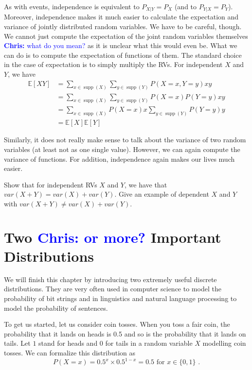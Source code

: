 \documentclass[a4paper,11pt,leqno]{report}
\newcommand{\chris}[1]{ \textcolor{blue}{\textbf{Chris:} #1}}
\newcommand{\supp}{\operatorname{supp}}
\newcommand{\E}{\mathbb{E}}
\begin{document}
As with events, independence is equivalent to $ P_{X|Y} = P_{X} $ (and
to $P_{Y|X}=P_Y$). Moreover, independence makes it much easier to calculate the expectation and variance of jointly distributed random variables. We have to be careful, though. We
cannot just compute the expectation of the joint random variables
themselves\chris{what do you mean?} as it is unclear what this would even be.
What we can do is to compute the expectation of functions of them. The standard choice in the case of expectation
is to simply multiply the RVs. For independent $X$ and $Y$, we have
\begin{align}
\E[XY] &= \sum_{x \in \supp(X)} \sum_{y \in \supp(Y)} P(X=x,Y=y) x y \\
&= \sum_{x \in \supp(X)} \sum_{y \in \supp(Y)} P(X=x)P(Y=y) x y \\
&= \sum_{x \in \supp(X)} P(X=x)x \sum_{y \in \supp(Y)}  P(Y=y) y \\
&= \E[X]\E[Y]
\end{align}

Similarly, it does not really make sense to talk about the variance of two random variables (at least not as one single
value). However, we can again compute the variance of functions. For addition, independence again makes our lives
much easier.

\begin{Exercise}
Show that for independent RVs $X$ and $Y$, we have that $ var(X + Y) =
var(X) + var(Y) $. Give an example of dependent $X$ and $Y$ with $ var(X + Y) \neq
var(X) + var(Y) $.
\end{Exercise}



\section{Two\chris{or more?} Important Distributions}

We will finish this chapter by introducing two extremely useful discrete distributions. They are very often used in
computer science to model the probability of bit strings and in linguistics and natural language processing to model
the probability of sentences. 

To get us started, let us consider coin tosses. When you toss a fair coin, the probability that it lands on heads is 0.5 and
so is the probability that it lands on tails. Let $ 1 $ stand for heads and $ 0 $ for tails in a random variable $ X $ 
modelling coin tosses. We can formalize this distribution as
\begin{equation*}
P(X=x) = 0.5^{x}\times 0.5^{1-x} = 0.5 \mbox{ for $x \in \{0,1\}$ .}
\end{equation*}
\end{document}
